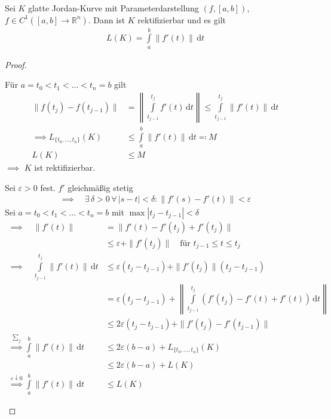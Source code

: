 \documentclass[a4paper,10pt]{scrbook}
\begin{document}
\begin{theorem}[Satz] \label{thm:6.11}
  Sei $K$ glatte Jordan-Kurve mit Parameterdarstellung $(f,[a,b])$, $f \in C^1([a,b] \to \mathbb{R}^n)$. Dann ist $K$ rektifizierbar und es gilt
  \begin{align*}
    L(K) = \int\limits_{a}^{b} \|f'(t)\| \, \mathrm{d}t
  \end{align*}

  \begin{proof}
    \begin{enum-arab}
      \item Für $a=t_0 < t_1 < \ldots < t_n=b$ gilt
      \begin{align*}
        \|f(t_j) - f(t_{j-1})\|
        &= \left\| \int\limits_{t_{j-1}}^{t_j} f'(t) \, \mathrm{d}t \right\|
        \leq \int\limits_{t_{j-1}}^{t_j} \|f'(t)\| \, \mathrm{d}t \\
        \implies L_{\{t_0,\ldots,t_n\}}(K)
        &\leq \int\limits_{a}^{b} \|f'(t)\| \, \mathrm{d}t \eqcolon M \\
        L(K) &\leq M
      \end{align*}
      $\implies$ $K$ ist rektifizierbar.

      \item Sei $\varepsilon > 0$ fest. $f'$ gleichmäßig stetig
      \begin{align*}
        \implies \quad \exists \, \delta > 0 \, \forall \, |s-t| < \delta : \|f'(s) - f'(t)\| < \varepsilon
      \end{align*}
      Sei $a=t_0 < t_1 < \ldots < t_n=b$ mit $\max|t_j - t_{j-1}| < \delta$
      \begin{align*}
        \implies \quad \|f'(t)\|
        &= \|f'(t) - f'(t_j) + f'(t_j)\| \\
        &\leq \varepsilon + \|f'(t_j)\| \quad \text{für } t_{j-1} \leq t \leq t_j \\
        \implies \quad \int\limits_{t_{j-1}}^{t_j} \|f'(t)\| \, \mathrm{d}t
        &\leq \varepsilon (t_j - t_{j-1}) + \|f'(t_j)\| (t_j - t_{j-1}) \\
        &= \varepsilon (t_j - t_{j-1}) + \left\| \int\limits_{t_{j-1}}^{t_j} \left( f'(t_j) - f'(t) + f'(t) \right) \, \mathrm{d}t \right\| \\
        &\leq 2 \varepsilon (t_j - t_{j-1}) + \|f'(t_j) - f'(t_{j-1})\| \\
        \overset{\sum_j}{\implies} \int\limits_{a}^{b} \|f'(t)\| \, \mathrm{d}t
        &\leq 2 \varepsilon (b-a) + L_{\{t_0,\ldots,t_n\}} (K) \\
        &\leq 2 \varepsilon (b-a) + L (K) \\
        \overset{\varepsilon \downarrow 0}{\implies} \int\limits_{a}^{b} \|f'(t)\| \, \mathrm{d}t &\leq L(K)
      \end{align*}
    \end{enum-arab}
  \end{proof}
\end{theorem}
\end{document}
